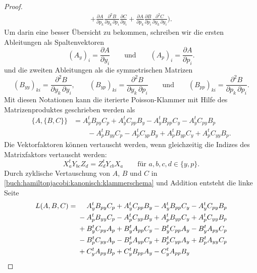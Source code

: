 \begin{proof}
\begin{align*}
+
\frac{\partial A}{\partial p_k}
\frac{\partial^2 B}{\partial y_k\,\partial p_i}
\frac{\partial C}{\partial y_i}
+
\frac{\partial A}{\partial p_k}
\frac{\partial B}{\partial p_i}
\frac{\partial^2 C}{\partial y_k\,\partial y_i}
\bigg).
\end{align*}
Um darin eine besser Übersicht zu bekommen, schreiben wir die ersten
Ableitungen als Spaltenvektoren
\[
(A_y)_i = \frac{\partial A}{\partial y_i}
\qquad\text{und}\qquad
(A_p)_i = \frac{\partial A}{\partial p_i}.
\]
und die zweiten Ableitungen als die symmetrischen Matrizen
\[
(B_{yy})_{ki} = \frac{\partial^2 B}{\partial y_k\,\partial y_i}
,
\qquad
(B_{yp})_{ki} = \frac{\partial^2 B}{\partial y_k\,\partial p_i}
\qquad\text{und}\qquad
(B_{pp})_{ki} = \frac{\partial^2 B}{\partial p_k\,\partial p_i}.
\]
Mit diesen Notationen
kann die iterierte Poisson-Klammer mit Hilfe des Matrizenproduktes
geschrieben werden als
\begin{equation}
\begin{aligned}
\{A,\{B,C\}\}
&=
A_y^tB_{py}C_p
+
A_y^tC_{pp}B_y
-
A_y^tB_{pp}C_y
-
A_y^tC_{py}B_p
\\
&\qquad
-
A_p^tB_{yy}C_p
-
A_p^tC_{yp}B_y
+
A_p^tB_{yp}C_y
+
A_p^tC_{yy}B_p.
\end{aligned}
\label{buch:hamiltonjacobi:kanonisch:klammerschema}
\end{equation}
Die Vektorfaktoren können vertauscht werden, wenn gleichzeitig die
Indizes des Matrixfaktors vertauscht werden:
\begin{equation}
X_a^t Y_{bc} Z_d
=
Z_d^t Y_{cb} X_a
\qquad
\text{für $a,b,c,d\in \{y,p\}$.}
\label{buch:hamiltonjacobi:kanonisch:eqn:xyz}
\end{equation}
Durch zyklische Vertauschung von $A$, $B$ und $C$ in
\eqref{buch:hamiltonjacobi:kanonisch:klammerschema} und
Addition entsteht die linke Seite
\begin{align*}
L(A,B,C)
&=
\mathstrut\phantom{\mathstrut-\mathstrut}
A_y^tB_{py}C_p
+
A_y^tC_{pp}B_y
-
A_y^tB_{pp}C_y
-
A_y^tC_{py}B_p
\\
&\phantom{\mathstrut=\mathstrut}
-
A_p^tB_{yy}C_p
-
A_p^tC_{yp}B_y
+
A_p^tB_{yp}C_y
+
A_p^tC_{yy}B_p
\\
&\phantom{\mathstrut=\mathstrut}
+
B_y^tC_{py}A_p
+
B_y^tA_{pp}C_y
-
B_y^tC_{pp}A_y
-
B_y^tA_{py}C_p
\\
&\phantom{\mathstrut=\mathstrut}
-
B_p^tC_{yy}A_p
-
B_p^tA_{yp}C_y
+
B_p^tC_{yp}A_y
+
B_p^tA_{yy}C_p
\\
&\phantom{\mathstrut=\mathstrut}
+
C_y^tA_{py}B_p
+
C_y^tB_{pp}A_y
-
C_y^tA_{pp}B_y

\end{align*}
\end{proof}
